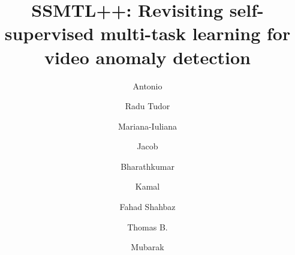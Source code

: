 \documentclass[times,twocolumn,final,authoryear]{elsarticle}
\begin{document}
\ifpreprint
  \setcounter{page}{1}
\else
  \setcounter{page}{1}
\fi

\begin{frontmatter}

\title{SSMTL++: Revisiting self-supervised multi-task learning for video anomaly detection}

\author[1]{Antonio } 
\author[1,2,3]{Radu Tudor }
\author[1,2]{Mariana-Iuliana }
\author[4,5]{Jacob }
\author[6]{Bharathkumar }
\author[4,5]{Kamal }
\author[3,7]{Fahad Shahbaz }
\author[4]{Thomas B. }
\author[8]{Mubarak }

\address[1]{Department of Computer Science, University of Bucharest, 14 Academiei Street, Bucharest 010014, Romania}
\address[2]{SecurifAI, 21D Mircea Voda, Bucharest 030662, Romania}
\address[3]{MBZ University of Artificial Intelligence, Masdar City, Abu Dhabi, UAE}
\address[4]{Department of Architecture, Design, and Media Technology, Aalborg University, Rendsburggade 14, Aalborg 9000, Denmark}
\address[5]{Milestone Systems, Banemarksvej 50C, Br{\o}ndby 2605, Denmark}
\address[6]{Geopipe Inc, 460 W 51st, New York City 10019, NY, US}
\address[7]{Link\"{o}ping University, 581 83 Link\"{o}ping, Sweden}
\address[8]{Center for Research in Computer Vision (CRCV), University of Central Florida, Orlando 32816, FL, US}




\end{frontmatter}
\end{document}
